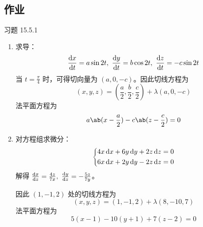 \subsection{作业}

\begin{problem}
    习题 15.5.1
    \begin{solution}
        \begin{enumerate}
            \item[\textbf{1)}] 求导：
            $$
            \dv{x}{t} = a \sin 2t,\ \dv{y}{t} = b \cos 2t,\ \dv{z}{t} = -c \sin 2t
            $$
            当 $t = \frac{\pi}{4}$ 时，可得切向量为 $(a, 0, -c)$。因此切线方程为
            $$
            (x, y, z) = (\frac{a}{2}, \frac{b}{2}, \frac{c}{2}) + \lambda (a, 0, -c)
            $$
            法平面方程为
            $$
            a \ab(x - \frac{a}{2}) - c \ab(z - \frac{c}{2}) = 0
            $$

            \item[\textbf{2)}] 对方程组求微分：
            $$
            \begin{dcases}
                4x \dd{x} + 6y \dd{y} + 2z \dd{z} = 0 \\
                6x \dd{x} + 2y \dd{y} - 2z \dd{z} = 0 \\
            \end{dcases}
            $$
            解得 $\dv{x}{z} = \frac{4z}{7x},\ \dv{y}{z} = -\frac{5z}{7y}$。

            因此 $(1, -1, 2)$ 处的切线方程为
            $$
            (x, y, z) = (1, -1, 2) + \lambda (8, -10, 7)
            $$
            法平面方程为
            $$
            5 (x - 1) - 10 (y + 1) + 7 (z - 2) = 0
            $$
        \end{enumerate}
    \end{solution}
\end{problem}

